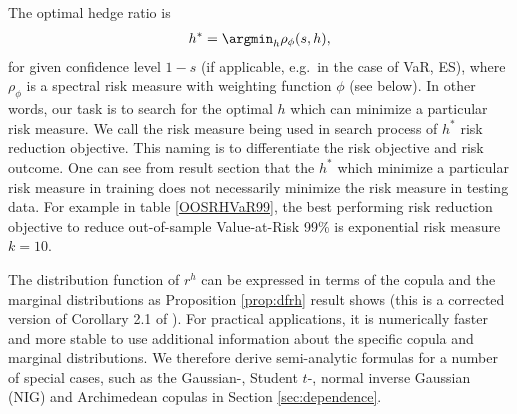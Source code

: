 \documentclass[11pt,a4paper,english]{article}
\begin{document}
The optimal hedge ratio is
\begin{align}
    h^\ast = \argmin_h \rho_\phi(s,h),
    \end{align}
for given
confidence level $1-s$ (if applicable, e.g.\ in the case of VaR, ES),
where $\rho_\phi$ is a spectral risk measure with weighting function
$\phi$ (see below).
In other words, our task is to search for the optimal $h$ which can minimize a particular risk measure.
We call the risk measure being used in search process of $h^\ast$ risk reduction objective.
This naming is to differentiate the risk objective and risk outcome.
One can see from result section that the $h^\ast$ which minimize a particular risk measure in training does not
necessarily minimize the risk measure in testing data.
For example in table \ref{OOSRHVaR99}, the best performing risk reduction objective to reduce out-of-sample Value-at-Risk 99\% is
exponential risk measure $k=10$. \medskip

The distribution function of $r^h$ can be expressed in terms of the
copula and the marginal distributions as Proposition \ref{prop:dfrh}
result shows (this is a corrected version of Corollary 2.1 of
\citep{barbi2014copula}). For practical applications, it is numerically
faster and more stable to use additional information about the
specific copula and marginal distributions. We therefore derive
semi-analytic formulas for a number of special cases, such as the
Gaussian-, Student $t$-, normal inverse Gaussian (NIG) and Archimedean
copulas in Section \ref{sec:dependence}.
\end{document}
